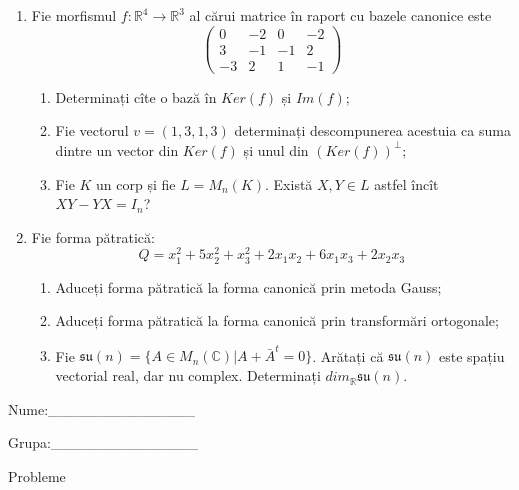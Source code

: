 \documentclass{article}
\begin{document}
\begin{enumerate}
 \item Fie morfismul $f:\mathbb{R}^4 \to \mathbb{R}^3$ al cărui matrice în raport cu bazele canonice este
$$\begin{pmatrix}
0&-2&0&-2\\
3&-1&-1&2\\
-3&2&1&-1
\end{pmatrix}$$

\begin{enumerate}
\item Determinați cîte o bază în $Ker(f)$ și $Im(f)$;
\item Fie vectorul $v=(1,3,1,3)$ determinați descompunerea acestuia ca suma dintre un vector din $Ker(f)$ și unul din $(Ker(f))^\perp$;
\item Fie $K$ un corp și fie $L=M_n(K)$. Există $X,Y \in L$ astfel încît $XY-YX=I_n$?  
\end{enumerate}
\item Fie forma pătratică:
$$Q= x_1^2+5x_2^2+x_3^2+2x_1x_2+6x_1x_3+2x_2x_3$$

\begin{enumerate}
\item Aduceți forma pătratică la forma canonică prin metoda Gauss;
\item Aduceți forma pătratică la forma canonică prin transformări ortogonale;
\item Fie $\mathfrak{su}(n)=\{ A \in M_n(\mathbb{C}) | A+\bar{A}^t=0\}$. Arătați că $\mathfrak{su}(n)$ este spațiu vectorial real, dar nu complex.
Determinați $dim_{\mathbb{R}}\mathfrak{su}(n)$.
\end{enumerate}
\end{enumerate}
\newpage
\begin{flushright}
Nume:\_\_\_\_\_\_\_\_\_\_\_\_\_\_
 
 
Grupa:\_\_\_\_\_\_\_\_\_\_\_\_\_\_
\end{flushright}
\begin{center}
\vspace{2cm}
{\Large Probleme}
\vspace{2cm}
\end{center}
\end{document}
